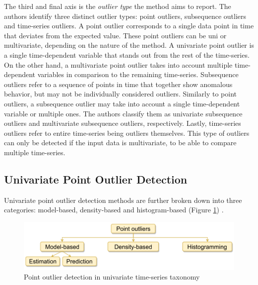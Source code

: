 The third and final axis is the \textit{outlier type} the method aims to report. The authors identify three distinct outlier types: point outliers, subsequence outliers and time-series outliers. A point outlier corresponds to a single data point in time that deviates from the expected value. These point outliers can be uni or multivariate, depending on the nature of the method. A univariate point outlier is a single time-dependent variable that stands out from the rest of the time-series. On the other hand, a multivariate point outlier takes into account multiple time-dependent variables in comparison to the remaining time-series. Subsequence outliers refer to a sequence of points in time that together show anomalous behavior, but may not be individually considered outliers. Similarly to point outliers, a subsequence outlier may take into account a single time-dependent variable or multiple ones. The authors classify them as univariate subsequence outliers and multivariate subsequence outliers, respectively. Lastly, time-series outliers refer to entire time-series being outliers themselves. This type of outliers can only be detected if the input data is multivariate, to be able to compare multiple time-series.

\subsection{Univariate Point Outlier Detection}

Univariate point outlier detection methods are further broken down into three categories: model-based, density-based and histogram-based (Figure \ref{fig:point-outlier-taxonomy}) .
\begin{figure}[!htb]
  \begin{center}
    \includegraphics[scale=1]{figures/taxonomy-point-outlier-uni.png}
    \caption[Point outlier detection in univariate time-series taxonomy]{Point outlier detection in univariate time-series taxonomy \cite{Blazquez-Garcia-Review-Anomaly-Detection}}
    \label{fig:point-outlier-taxonomy}
  \end{center}
\end{figure}

